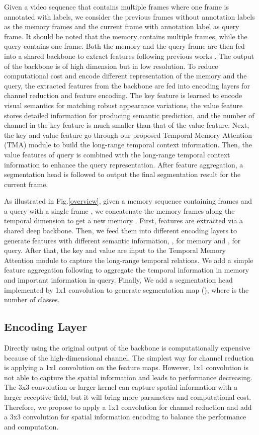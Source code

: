 \documentclass{article}
\begin{document}
	
Given a video sequence that contains multiple frames where one frame is annotated with labels, we consider the previous frames without annotation labels as the memory frames and the current frame with annotation label as query frame. It should be noted that the memory contains multiple frames, while the query contains one frame. Both the memory and the query frame are then fed into a shared backbone to extract features following previous works \cite{TDNet2019, PSPNet2017, DANet2019}. The output of the backbone is of high dimension but in low resolution. To reduce computational cost and encode different representation of the memory and the query, the extracted features from the backbone are fed into encoding layers for channel reduction and feature encoding. The key feature is learned to encode visual semantics for matching robust appearance variations, the value feature stores detailed information for producing semantic prediction, and the number of channel in the key feature is much smaller than that of the value feature. Next, the key and value feature go through our proposed Temporal Memory Attention (TMA) module to build the long-range temporal context information. Then, the value features of query is combined with the long-range temporal context information to enhance the query representation. After feature aggregation, a segmentation head is followed to output the final segmentation result for the current frame.


	
	As illustrated in Fig.\ref{overview}, given a memory sequence containing  frames and a query with a single frame , we concatenate the memory frames along the temporal dimension to get a new memory . First, features are extracted via a shared deep backbone. Then, we feed them into different encoding layers to generate features with different semantic information, ,  for memory and  ,  for query. After that, the key and value are input to the Temporal Memory Attention module to capture the long-range temporal relations. We add a simple feature aggregation following \cite{DANet2019, STA2019} to aggregate the temporal information in memory and important information in query. Finally, We add a segmentation head implemented by 1x1 convolution to generate segmentation map (), where  is the number of classes.
	
	\subsection{Encoding Layer}
Directly using the original output of the backbone is computationally expensive because of the high-dimensional channel.
	The simplest way for channel reduction is applying a 1x1 convolution on the feature maps. However, 1x1 convolution is not able to capture the spatial information and leads to performance decreasing. 
	The 3x3 convolution or larger kernel can capture spatial information with a larger receptive field, but it will bring more parameters and computational cost. 
	Therefore, we propose to apply a 1x1 convolution for channel reduction and add a 3x3 convolution for spatial information encoding to balance the performance and computation.
	
\end{document}

